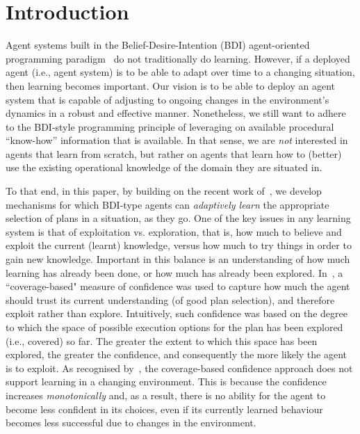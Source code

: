\section{Introduction}\label{sec:introduction}

Agent systems built in the Belief-Desire-Intention (BDI)
agent-oriented programming
paradigm~\cite{Georgeff89-PRS,Rao96:AgentSpeak,WooldridgeBook} do not
traditionally do learning.  
However, if a deployed agent (i.e., agent system) is to be able to
adapt over time to a changing situation, then learning becomes
important. Our vision is to be able to deploy an agent system that is
capable of adjusting to ongoing changes in the environment's dynamics
in a robust and effective manner. Nonetheless, we still want to adhere
to the BDI-style programming principle of leveraging on available
procedural ``know-how'' information that is available. In that sense,
we are \emph{not} interested in agents that learn from scratch, but
rather on agents that learn how to (better) use the existing
operational knowledge of the domain they are situated in.  



To that end, in this paper, by building on the recent work of~\cite{airiau09:enhancing,singh10:extending,singh10:learning}, we develop mechanisms for which BDI-type agents can \emph{adaptively learn} the appropriate selection of plans in a situation, as they go. 
One of the key issues in any learning system is that of exploitation vs. exploration, that is, how much to believe and exploit the current (learnt) knowledge, versus how much to try things in order to gain new knowledge. Important in this balance is an understanding of how much learning has already been done, or how much has already been explored. In~\cite{singh10:extending,singh10:learning}, a ``coverage-based" measure of confidence was used to capture how much the agent should trust its current understanding (of good plan selection), and therefore exploit rather than explore. Intuitively, such confidence was based on the degree to which the space of possible execution options for the plan has been explored (i.e., covered) so far. The greater the extent to which this space has been explored, the greater the confidence, and consequently the more likely the agent is to exploit.  
%
As recognised by~\cite{singh10:learning}, the coverage-based confidence approach does not support learning in a changing environment. This is because the confidence increases \emph{monotonically} and, as a result, there is no ability for the agent to become less confident in its choices, even if its currently learned behaviour becomes less successful due to changes in the environment.



